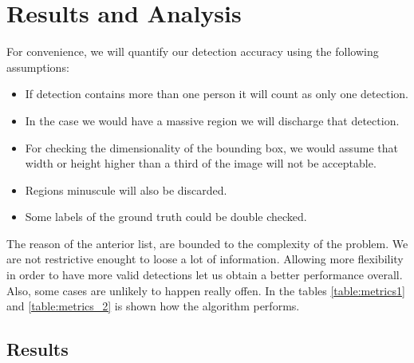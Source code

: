\documentclass[10pt]{article}
\begin{document}


\section{Results and Analysis}

For convenience, we will quantify our detection accuracy using the following assumptions:

\begin{itemize}
  \item If detection contains more than one person it will count as only one detection.
  \item In the case we would have a massive region we will discharge that detection.
  \item For checking the dimensionality of the bounding box, we would assume that width or height higher than a third of the image will not be acceptable.
  \item Regions minuscule will also be discarded.
  \item Some labels of the ground truth could be double checked.
\end{itemize}

The reason of the anterior list, are bounded to the complexity of the problem. We are not restrictive enought to loose a lot of information. Allowing more flexibility in order to have more valid detections let us obtain a better performance overall. Also, some cases are unlikely to happen really offen. In the tables \ref{table:metrics1} and \ref{table:metrics_2} is shown how the algorithm performs.

\subsection*{Results}
\end{document}
